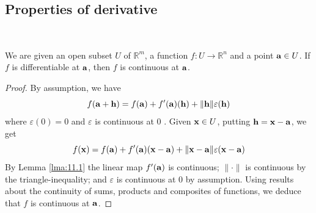 \documentclass[a4paper]{article}
\begin{document}
\subsection{Properties of derivative}
\ \vspace*{-1.5em}
\begin{proposition}
    We are given an open subset $U$ of $\mathbb{R}^{m}$, a function $f: U \rightarrow \mathbb{R}^{n}$ and a point ${\bf a} \in U$. If $f$ is differentiable at ${\bf a}$, then $f$ is continuous at ${\bf a}$.
\end{proposition}
\begin{proof}
    By assumption, we have
$$
f({\bf a}+{\bf h})=f({\bf a})+f^{\prime}({\bf a})({\bf h})+\|{\bf h}\| \varepsilon({\bf h})
$$
where $\varepsilon(0)=0$ and $\varepsilon$ is continuous at 0 . Given ${\bf x} \in U$, putting ${\bf h}={\bf x}-{\bf a}$, we get
$$
f({\bf x})=f({\bf a})+f^{\prime}({\bf a})({\bf x}-{\bf a})+\|{\bf x}-{\bf a}\| \varepsilon({\bf x}-{\bf a})
$$
By Lemma \ref{lma:11.1} the linear map $f^{\prime}({\bf a})$ is continuous; $\|\cdot\|$ is continuous by the triangle-inequality; and $\varepsilon$ is continuous at 0 by assumption. Using results about the continuity of sums, products and composites of functions, we deduce that $f$ is continuous at ${\bf a}$.
\end{proof}
\end{document}
